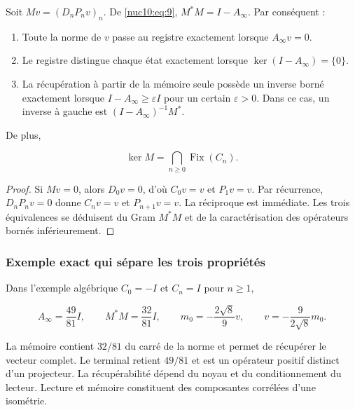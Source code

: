 Soit \(Mv=(D_nP_nv)_n\). De \eqref{nuc10:eq:9}, \(M^*M=I-A_\infty\). Par conséquent :

\begin{enumerate}
\item Toute la norme de \(v\) passe au registre exactement lorsque \(A_\infty v=0\).

\item Le registre distingue chaque état exactement lorsque \(\ker(I-A_\infty)=\{0\}\).
\item La récupération à partir de la mémoire seule possède un inverse borné exactement lorsque
\(I-A_\infty\geq\varepsilon I\) pour un certain \(\varepsilon>0\).
Dans ce cas, un inverse à gauche est \((I-A_\infty)^{-1}M^*\).

\end{enumerate}

De plus,



\begin{equation}
\boxed{\ker M=\bigcap_{n\ge0}\operatorname{Fix}(C_n).}
\label{nuc10:eq:12}
\end{equation}



\begin{proof}
Si \(Mv=0\), alors \(D_0v=0\), d’où \(C_0v=v\)
et \(P_1v=v\). Par récurrence, \(D_nP_nv=0\) donne \(C_nv=v\) et
\(P_{n+1}v=v\). La réciproque est immédiate. Les trois équivalences se
déduisent du Gram \(M^*M\) et de la caractérisation des opérateurs
bornés inférieurement.
\end{proof}

\subsubsection{Exemple exact qui sépare les trois propriétés}

Dans l’exemple algébrique \(C_0=-I\) et \(C_n=I\) pour \(n\geq1\),



\begin{equation}
A_\infty=\frac{49}{81}I,\qquad M^*M=\frac{32}{81}I,
\qquad m_0=-\frac{2\sqrt8}{9}v,
\qquad v=-\frac9{2\sqrt8}m_0.
\label{nuc10:eq:13}
\end{equation}



La mémoire contient \(32/81\) du carré de la norme et permet de récupérer le vecteur complet. Le terminal retient \(49/81\) et est un opérateur positif distinct d’un projecteur. La récupérabilité dépend du noyau et du conditionnement du lecteur. Lecture et mémoire constituent des composantes corrélées d’une isométrie.


